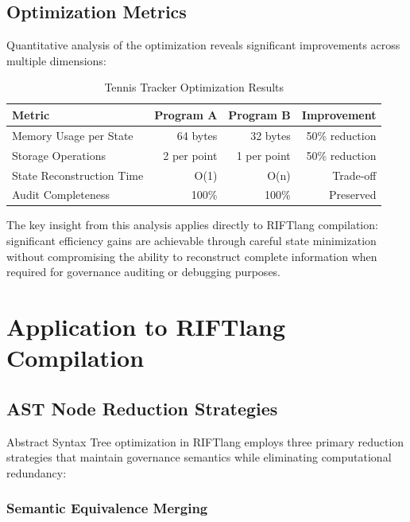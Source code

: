 \subsection{Optimization Metrics}

Quantitative analysis of the optimization reveals significant improvements across multiple dimensions:

\begin{table}[h]
\centering
\begin{tabular}{|l|r|r|r|}
\hline
\textbf{Metric} & \textbf{Program A} & \textbf{Program B} & \textbf{Improvement} \\
\hline
Memory Usage per State & 64 bytes & 32 bytes & 50\% reduction \\
Storage Operations & 2 per point & 1 per point & 50\% reduction \\
State Reconstruction Time & O(1) & O(n) & Trade-off \\
Audit Completeness & 100\% & 100\% & Preserved \\
\hline
\end{tabular}
\caption{Tennis Tracker Optimization Results}
\label{tab:tennis_optimization}
\end{table}

The key insight from this analysis applies directly to RIFTlang compilation: significant efficiency gains are achievable through careful state minimization without compromising the ability to reconstruct complete information when required for governance auditing or debugging purposes.

\section{Application to RIFTlang Compilation}

\subsection{AST Node Reduction Strategies}

Abstract Syntax Tree optimization in RIFTlang employs three primary reduction strategies that maintain governance semantics while eliminating computational redundancy:

\subsubsection{Semantic Equivalence Merging}

